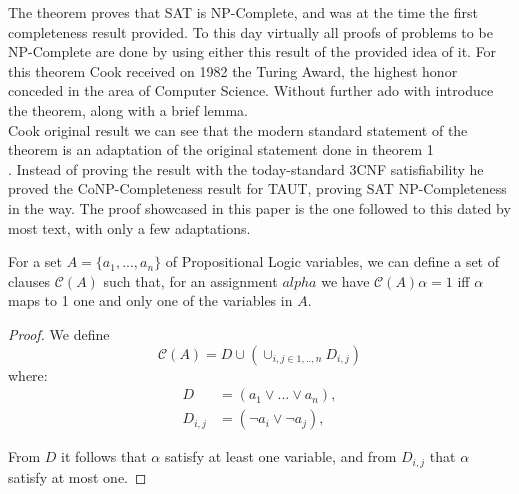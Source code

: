 The theorem proves that SAT is NP-Complete, and was at the time the first completeness result provided. To this day virtually all proofs of problems to be NP-Complete are done by using either this result of the provided idea of it. For this theorem Cook received on 1982 the Turing Award, the highest honor conceded in the area of Computer Science. Without further ado with introduce the theorem, along with a brief lemma.\\

 Cook original result we can see that the modern standard statement of the theorem is an adaptation of the original statement done in theorem 1\\ \cite{cook1971complexity}. Instead of proving the result with the today-standard 3CNF satisfiability he proved the CoNP-Completeness result for TAUT, proving SAT NP-Completeness in the way. The proof showcased in this paper is the one followed to this dated by most text, with only a few adaptations. 

\begin{lemma}
  For a set $A = \{a_1,...,a_n\}$ of Propositional Logic variables, we can define a set of clauses $\mathcal{C}(A)$ such that, for an assignment $alpha$ we have   $\mathcal{C}(A)\alpha = 1$ iff $\alpha$ maps to 1 one and only one of the variables in $A$.
\end{lemma}
\begin{proof}
  We define $$\mathcal{C}(A) = D\cup \left (  \cup_{i,j \in 1,..,n} D_{i,j} \right )$$ where:
  \begin{equation}
    \begin{split}
      D & = (a_1 \vee ... \vee a_n ),\\
      D_{i,j} & = (\neg a_{i} \vee \neg a_{j} ),
\end{split}
\end{equation}

From $D$ it follows that $\alpha$ satisfy at least one variable, and from $D_{i,j}$ that $\alpha$ satisfy at most one.
\end{proof}


